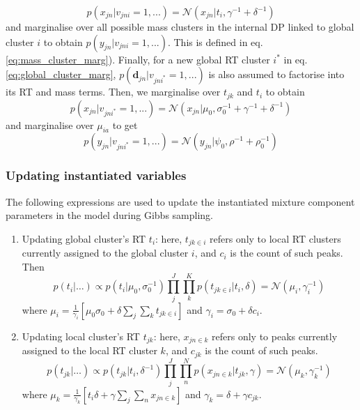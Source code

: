 \begin{enumerate}
\begin{dmath}
p(x_{jn}|v_{jni}=1,...)=\mathcal{N}(x_{jn}|t_{i},\gamma^{-1}+\delta^{-1})
\label{eq:existing_global_factors}
\end{dmath}
and marginalise over all possible mass clusters in the internal DP linked to global cluster $i$ to obtain $p(y_{jn}|v_{jni}=1,...)$. This is defined in eq. \ref{eq:mass_cluster_marg}). 
Finally, for a new global RT cluster $i^{*}$ in eq. \ref{eq:global_cluster_marg}, $p(\mathbf{d}_{jn}|v_{jni^{*}}=1,...)$ is also assumed to factorise into its RT and mass terms. Then, we marginalise over $t_{jk}$ and $t_{i}$ to obtain
\begin{dmath}
p(x_{jn}|v_{jni^{*}}=1,...)=\mathcal{N}(x_{jn}|\mu_{0},\sigma_{0}^{-1}+\gamma^{-1}+\delta^{-1})
\end{dmath}
and marginalise over $\mu_{ia}$ to get 
\begin{dmath}
p(y_{jn}|v_{jni^{*}}=1,...)=\mathcal{N}(y_{jn}|\psi_{0},\rho^{-1}+\rho_{0}^{-1})
\end{dmath}

\end{enumerate}

\subsubsection{Updating instantiated variables}

The following expressions are used to update the instantiated mixture component parameters in the model during Gibbs sampling.

\begin{enumerate}
\item Updating global cluster's RT $t_{i}$: here, $t_{jk\in i}$ refers only to local RT clusters currently assigned to the global cluster $i$, and $c_{i}$ is the count of such peaks. Then
\begin{dmath}
p(t_{i}|\ldots)\propto p(t_{i}|\mu_{0},\sigma_{0}^{-1})\prod_{j}^{J}\prod_{k}^{K}p(t_{jk\in i}|t_{i},\delta)=\mathcal{N}(\mu_{i},\gamma_{i}^{-1})
\end{dmath}
where $\mu_{i}=\frac{1}{\gamma_{i}}\left[\mu_{0}\sigma_{0}+\delta\sum_{j}\sum_{k}t_{jk\in i}\right]$ and $\gamma_{i}=\sigma_{0}+\delta c_{i}$. 
\item Updating local cluster's RT $t_{jk}$: here, $x_{jn\in k}$ refers only to peaks currently assigned to the local RT cluster $k$, and
$c_{jk}$ is the count of such peaks.
\begin{dmath}
p(t_{jk}|\ldots)\propto p(t_{jk}|t_{i},\delta^{-1})\prod_{j}^{J}\prod_{n}^{N}p(x_{jn\in k}|t_{jk},\gamma)=\mathcal{N}(\mu_{k},\gamma_{k}^{-1})
\end{dmath}
where $\mu_{k}=\frac{1}{\gamma_{k}}\left[t_{i}\delta+\gamma\sum_{j}\sum_{n}x_{jn\in k}\right]$ and $\gamma_{k}=\delta+\gamma c_{jk}$. 
\end{enumerate}

